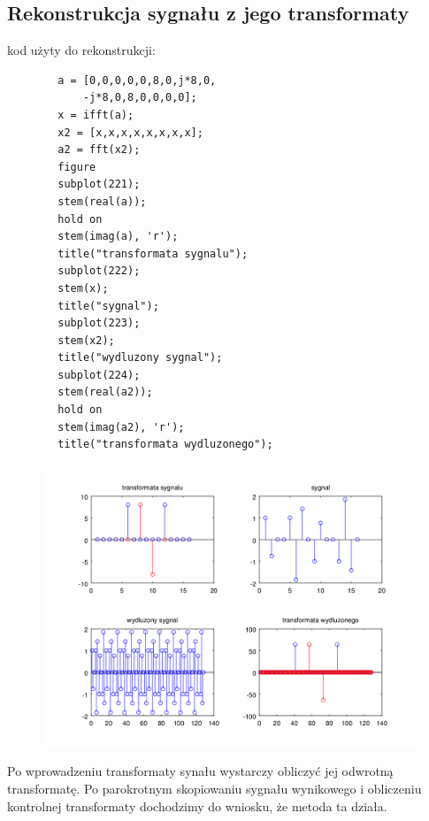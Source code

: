 \documentclass[12pt,titlepage]{report}
\begin{document}
\subsection{Rekonstrukcja sygnału z jego transformaty}
kod użyty do rekonstrukcji:
\begin{multicols}{3}
	{
		\footnotesize
		\begin{verbatim}
		a = [0,0,0,0,0,8,0,j*8,0,
			-j*8,0,8,0,0,0,0];
		x = ifft(a);
		x2 = [x,x,x,x,x,x,x,x];
		a2 = fft(x2);
		figure
		subplot(221);
		stem(real(a));
		hold on
		stem(imag(a), 'r');
		title("transformata sygnalu");
		subplot(222);
		stem(x);
		title("sygnal");
		subplot(223);
		stem(x2);
		title("wydluzony sygnal");
		subplot(224);
		stem(real(a2));
		hold on
		stem(imag(a2), 'r');
		title("transformata wydluzonego");
		\end{verbatim}
	}
\end{multicols}

\begin{figure}[!h]
	\centering
	\includegraphics[scale=0.7]{../cw23_output}
	\caption{}
\end{figure}
Po wprowadzeniu transformaty synału wystarczy obliczyć jej odwrotną transformatę. Po parokrotnym skopiowaniu sygnału wynikowego i obliczeniu kontrolnej transformaty dochodzimy do wniosku, że metoda ta działa.
\newpage
\end{document}
